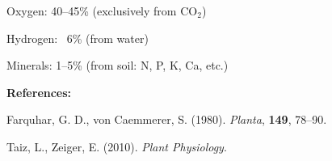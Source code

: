 \begin{technical}
\noindent Oxygen: 40–45\% (exclusively from $\mathrm{CO}_2$)

\noindent Hydrogen: ~6\% (from water)

\noindent Minerals: 1–5\% (from soil: N, P, K, Ca, etc.)

\vspace{0.5em}
\noindent\textbf{References:}

\vspace{0.2em}
\noindent Farquhar, G. D., von Caemmerer, S. (1980). \textit{Planta}, \textbf{149}, 78–90.

\noindent Taiz, L., Zeiger, E. (2010). \textit{Plant Physiology}.
\end{technical}
